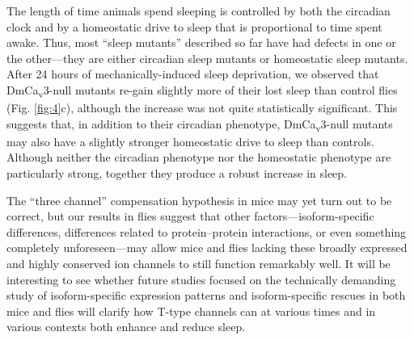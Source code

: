 The length of time animals spend sleeping is controlled by both the circadian clock and by a homeostatic drive to sleep that is proportional to time spent awake.
Thus, most ``sleep mutants'' described so far have had defects in one or the other---they are either circadian sleep mutants or homeostatic sleep mutants.
After 24 hours of mechanically-induced sleep deprivation, we observed that DmCa\textsubscript{v}3-null mutants re-gain slightly more of their lost sleep than control flies (Fig. \ref{fig:4}c), although the increase was not quite statistically significant.
This suggests that, in addition to their circadian phenotype, DmCa\textsubscript{v}3-null mutants may also have a slightly stronger homeostatic drive to sleep than controls.
Although neither the circadian phenotype nor the homeostatic phenotype are particularly strong, together they produce a robust increase in sleep.

The ``three channel'' compensation hypothesis in mice may yet turn out to be correct, but our results in flies suggest that other factors---isoform-specific differences, differences related to protein--protein interactions, or even something completely unforeseen---may allow mice and flies lacking these broadly expressed and highly conserved ion channels to still function remarkably well.
It will be interesting to see whether future studies focused on the technically demanding study of isoform-specific expression patterns and isoform-specific rescues in both mice and flies will clarify how T-type channels can at various times and in various contexts both enhance and reduce sleep.
